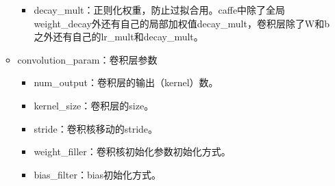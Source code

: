 \begin{enumerate}
\begin{itemize}
\begin{itemize}
					\item decay\_mult：正则化权重，防止过拟合用。caffe中除了全局weight\_decay外还有自己的局部加权值decay\_mult，卷积层除了W和b之外还有自己的lr\_mult和decay\_mult。
				\end{itemize}
					\item convolution\_param：卷积层参数
						\begin{itemize}
							\item num\_output：卷积层的输出（kernel）数。
							\item kernel\_size：卷积层的size。
							\item stride：卷积核移动的stride。
							\item weight\_filler：卷积核初始化参数初始化方式。
							\item bias\_filter：bias初始化方式。
						\end{itemize}
		\end{itemize}
\end{enumerate}
